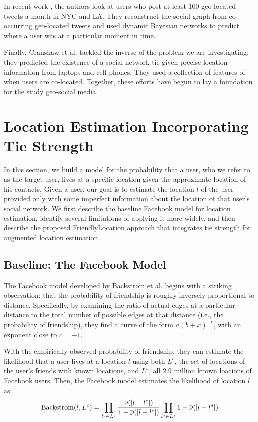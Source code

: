 \documentclass[letterpaper]{article}
\DeclareMathOperator{\Backstrom}{Backstrom}
\DeclareMathOperator{\p}{p}
\begin{document}

In recent work \cite{sadilek2012finding}, the authors look at users who post at least 100 geo-located tweets a month in NYC and LA. They reconstruct the social graph from co-occurring geo-located tweets and used dynamic Bayesian networks to predict where a user was at a particular moment in time.

Finally, Cranshaw et al. \cite{cranshaw2010bridging} tackled the inverse of the problem we are investigating: they predicted the existence of a social network tie given precise location information from laptops and cell phones. They used a collection of features of when users are co-located.  Together, these efforts have begun to lay a foundation for the study geo-social media.

\section{Location Estimation Incorporating Tie Strength}
In this section, we build a model for the probability that a user, who we refer to as the target user, lives at a specific location given the approximate location of his contacts. Given a user, our goal is to estimate the location $l$ of the user provided only with some imperfect information about the location of that user's social network.  We first describe the baseline Facebook model for location estimation, identify several limitations of applying it more widely, and then describe the proposed FriendlyLocation approach that integrates tie strength for augmented location estimation.

\subsection{Baseline: The Facebook Model}
The Facebook model developed by Backstrom et al. \cite{backstrom2010find} begins with a striking observation: that the probability of friendship is roughly inversely proportional to distance. Specifically, by examining the ratio of actual edges at a particular distance to the total number of possible edges at that distance (i.e., the probability of friendship), they find a curve of the form $a(b+x)^{-c}$, with an exponent close to $c=-1$. 

With the empirically observed probability of friendship, they can estimate the
likelihood that a user lives at a location $l$ using both $L^c$, the set of
locations of the user's friends with known locations, and $L^s$, all 2.9
million known loacions of Facebook users.
%
Then, the Facebook model estimates the likelihood of location $l$ as:
\[
    \Backstrom(l,L^c) =
        \prod_{l^c \in L^c} {\p(|l-l^c|) \over 1-\p(|l-l^c|) }
        \prod_{l^s \in L^s} 1-\p(|l-l^s|)
\]
\end{document}
